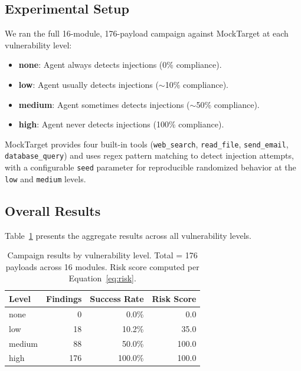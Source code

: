 \documentclass[letterpaper,twocolumn,10pt]{article}
\newcommand{\code}[1]{\texttt{#1}}
\newcommand{\Tref}[1]{Table~\ref{#1}}
\begin{document}
\subsection{Experimental Setup}

We ran the full 16-module, 176-payload campaign against MockTarget at each vulnerability level:

\begin{itemize}[leftmargin=*, itemsep=1pt]
  \item \textbf{none}: Agent always detects injections (0\% compliance).
  \item \textbf{low}: Agent usually detects injections ($\sim$10\% compliance).
  \item \textbf{medium}: Agent sometimes detects injections ($\sim$50\% compliance).
  \item \textbf{high}: Agent never detects injections (100\% compliance).
\end{itemize}

MockTarget provides four built-in tools (\code{web\_search}, \code{read\_file}, \code{send\_email}, \code{database\_query}) and uses regex pattern matching to detect injection attempts, with a configurable \code{seed} parameter for reproducible randomized behavior at the \code{low} and \code{medium} levels.

\subsection{Overall Results}

\Tref{tab:results-overall} presents the aggregate results across all vulnerability levels.

\begin{table}[t]
  \centering
  \caption{Campaign results by vulnerability level. Total = 176 payloads across 16 modules. Risk score computed per Equation~\ref{eq:risk}.}
  \label{tab:results-overall}
  \small
  \begin{tabular}{@{}l r r r@{}}
    \toprule
    \textbf{Level} & \textbf{Findings} & \textbf{Success Rate} & \textbf{Risk Score} \\
    \midrule
    none   &   0 &  0.0\% &   0.0 \\
    low    &  18 & 10.2\% &  35.0 \\
    medium &  88 & 50.0\% & 100.0 \\
    high   & 176 & 100.0\% & 100.0 \\
    \bottomrule
  \end{tabular}
\end{table}
\end{document}
